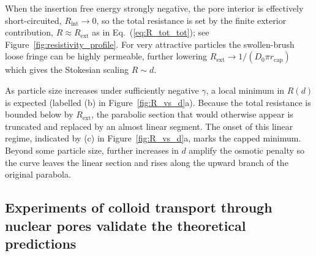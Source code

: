 \documentclass[12pt, a4paper]{article}
\begin{document}
  


When the insertion free energy strongly negative, the pore interior is effectively short-circuited, $R_{\text{int}} \to 0$, 
so the total resistance is set by the finite exterior contribution, $R\approx R_{\text{ext}}$ as in Eq.~(\ref{eq:R_tot_tot}); 
see Figure~\ref{fig:resistivity_profile}.  
For very attractive particles the swollen-brush loose fringe can be highly permeable, 
further lowering $R_{\text{ext}} \to 1 / (D_0 \pi r_\text{cap})$ which gives the Stokesian scaling  $R \sim d$.

As particle size increases under sufficiently negative $\gamma$, a local minimum in $R(d)$ is expected (labelled \raisebox{0.25em}{\scriptsize$\uparrow$}(b) in Figure~\ref{fig:R_vs_d}a).  
Because the total resistance is bounded below by $R_{\text{ext}}$, the parabolic section that would otherwise appear is truncated and replaced by an almost linear segment.  
The onset of this linear regime, indicated by \raisebox{0.25em}{\scriptsize$\uparrow$}(c) in Figure~\ref{fig:R_vs_d}a, marks the capped minimum.  
Beyond some particle size, further increases in $d$ amplify the osmotic penalty 
so the curve leaves the linear section and rises along the upward branch of the original parabola.

\subsection{Experiments of colloid transport through nuclear pores validate the theoretical predictions}
\end{document}
